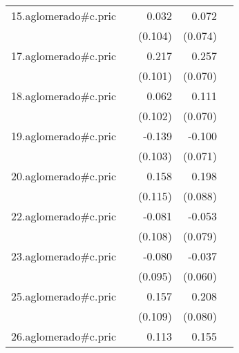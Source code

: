 {\begin{longtable}{l*{4}{D{.}{.}{-1}}}
\addlinespace
15.aglomerado#c.pric&                     &       0.032         &       0.072         &                     \\
            &                     &     (0.104)         &     (0.074)         &                     \\
\addlinespace
17.aglomerado#c.pric&                     &       0.217\sym{*}  &       0.257\sym{***}&                     \\
            &                     &     (0.101)         &     (0.070)         &                     \\
\addlinespace
18.aglomerado#c.pric&                     &       0.062         &       0.111         &                     \\
            &                     &     (0.102)         &     (0.070)         &                     \\
\addlinespace
19.aglomerado#c.pric&                     &      -0.139         &      -0.100         &                     \\
            &                     &     (0.103)         &     (0.071)         &                     \\
\addlinespace
20.aglomerado#c.pric&                     &       0.158         &       0.198\sym{*}  &                     \\
            &                     &     (0.115)         &     (0.088)         &                     \\
\addlinespace
22.aglomerado#c.pric&                     &      -0.081         &      -0.053         &                     \\
            &                     &     (0.108)         &     (0.079)         &                     \\
\addlinespace
23.aglomerado#c.pric&                     &      -0.080         &      -0.037         &                     \\
            &                     &     (0.095)         &     (0.060)         &                     \\
\addlinespace
25.aglomerado#c.pric&                     &       0.157         &       0.208\sym{**} &                     \\
            &                     &     (0.109)         &     (0.080)         &                     \\
\addlinespace
26.aglomerado#c.pric&                     &       0.113         &       0.155\sym{*}  &                     \\

\end{longtable}}
